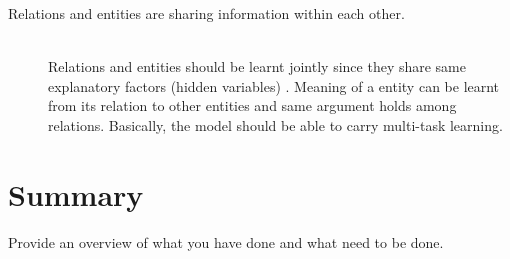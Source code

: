\documentclass[12pt]{report}
\begin{document}
\begin{description}
  \item[Relations and entities are sharing information within each other.] \hfill \\
  Relations and entities should be learnt jointly since they share same explanatory factors (hidden variables)
  . Meaning of a entity can be learnt from its relation to other entities and same argument holds among relations.
  Basically, the model should be able to carry multi-task learning. 
    
\end{description}


\section{Summary}
\label{ch:conclusion}


Provide an overview of what you have done and what need to be done.






\pagebreak

\begin{footnotesize}

%

\end{footnotesize}
\end{document}
